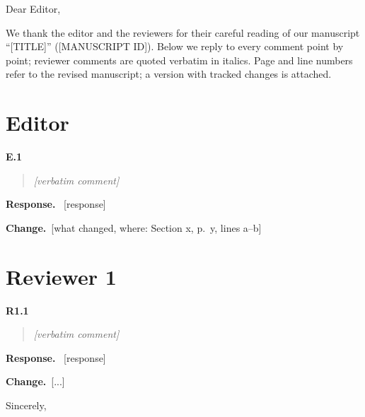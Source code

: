 \documentclass[11pt]{article}
\newenvironment{point}[1]{\par\medskip\noindent\textbf{#1}\par\begin{quote}\itshape}{\end{quote}}
\newenvironment{reply}{\par\noindent\textbf{Response.}\ }{\par}
\newcommand{\change}[1]{\par\noindent\textbf{Change.}\ #1\par}
\begin{document}
\noindent Dear Editor,\par\medskip
\noindent We thank the editor and the reviewers for their careful reading of our manuscript
``[TITLE]'' ([MANUSCRIPT ID]). Below we reply to every comment point by point; reviewer comments are
quoted verbatim in italics. Page and line numbers refer to the revised manuscript; a version with
tracked changes is attached.

\section*{Editor}
\begin{point}{E.1}
[verbatim comment]
\end{point}
\begin{reply}
[response]
\end{reply}
\change{[what changed, where: Section x, p.\ y, lines a--b]}

\section*{Reviewer 1}
\begin{point}{R1.1}
[verbatim comment]
\end{point}
\begin{reply}
[response]
\end{reply}
\change{[...]}

\bigskip\noindent Sincerely,\par{}
\end{document}
